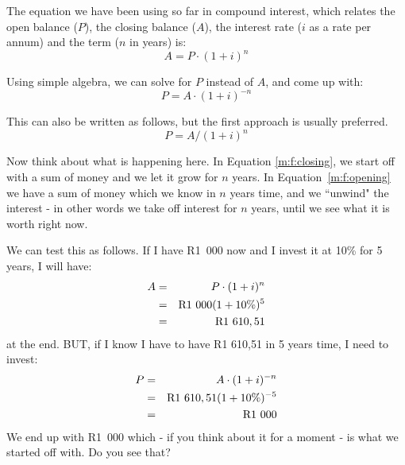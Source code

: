 The equation we have been using so far in compound interest, which relates the open balance ($P$), the closing balance ($A$), the interest rate ($i$ as a rate per annum) and the term ($n$ in years) is:
\begin{equation}
A = P \cdot (1+i)^n
\label{m:f:closing}
\end{equation}

Using simple algebra, we can solve for $P$ instead of $A$, and come up with:
\begin{equation}
P = A \cdot (1+i)^{-n}
\label{m:f:opening}
\end{equation}

This can also be written as follows, but the first approach is usually preferred.
\begin{equation}
P = A / (1+i)^n
\label{m:f:opening2}
\end{equation}

Now think about what is happening here. In Equation \ref{m:f:closing}, we start off with a sum of money and we let it grow for $n$ years. In Equation~\ref{m:f:opening} we have a sum of money which we know in $n$ years time, and we ``unwind" the interest - in other words we take off interest for $n$ years, until we see what it is worth right now.

We can test this as follows. If I have R1~000 now and I invest it at 10\% for 5 years, I will have:
\begin{eqnarray*}
A &=& P \cdot (1+i)^n\\
&=&\rm{R}1~000(1+10\%)^5\\
&=&\rm{R}1~610,51
\end{eqnarray*}
at the end. BUT, if I know I have to have R1 610,51 in 5 years time, I need to invest:
\begin{eqnarray*}
P &=& A \cdot (1+i)^{-n}\\
&=&\rm{R}1~610,51(1+10\%)^{-5}\\
&=&\rm{R}1~000
\end{eqnarray*}
We end up with R1~000 which - if you think about it for a moment - is what we started off with. Do you see that?


